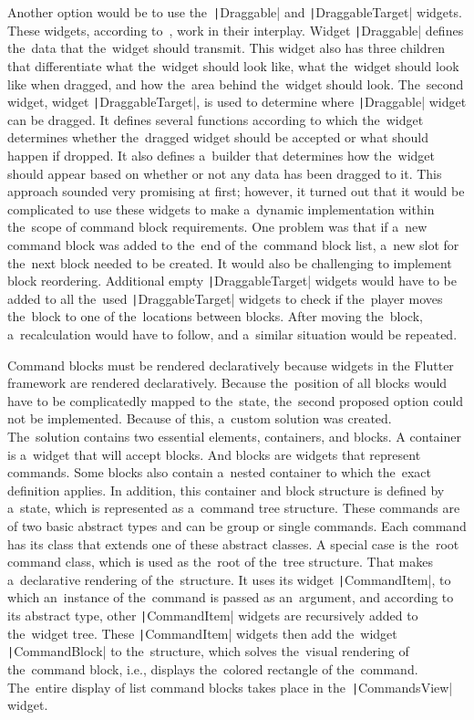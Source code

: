 Another option would be to use the~\texttt|Draggable| and \texttt|DraggableTarget| widgets.
These widgets, according to~\cite{a2022_material}, work in their interplay.
Widget \texttt|Draggable| defines the~data that the~widget should transmit.
This widget also has three children that differentiate what the~widget should look like, what the~widget should look like when dragged, and how the~area behind the~widget should look.
The~second widget, widget \texttt|DraggableTarget|, is used to determine where \texttt|Draggable| widget can be dragged.
It defines several functions according to which the~widget determines whether the~dragged widget should be accepted or what should happen if dropped.
It also defines a~builder that determines how the~widget should appear based on whether or not any data has been dragged to it.
This approach sounded very promising at first; however, it turned out that it would be complicated to use these widgets to make a~dynamic implementation within the~scope of command block requirements.
One problem was that if a~new command block was added to the~end of the~command block list, a~new slot for the~next block needed to be created.
It would also be challenging to implement block reordering.
Additional empty \texttt|DraggableTarget| widgets would have to be added to all the~used \texttt|DraggableTarget| widgets to check if the~player moves the~block to one of the~locations between blocks.
After moving the~block, a~recalculation would have to follow, and a~similar situation would be repeated.

Command blocks must be rendered declaratively because widgets in the \mbox{Flutter} framework are rendered declaratively.
Because the~position of all blocks would have to be complicatedly mapped to the~state, the~second proposed option could not be implemented.
Because of this, a~custom solution was created.
The~solution contains two essential elements, containers, and blocks.
A container is a~widget that will accept blocks.
And blocks are widgets that represent commands.
Some blocks also contain a~nested container to which the~exact definition applies.
In addition, this container and block structure is defined by a~state, which is represented as a~command tree structure.
These commands are of two basic abstract types and can be group or single commands.
Each command has its class that extends one of these abstract classes.
A special case is the~root command class, which is used as the~root of the~tree structure.
That makes a~declarative rendering of the~structure.
\linebreak
It uses its widget \texttt|CommandItem|, to which an~instance of the~command is passed as an~argument, and according to its abstract type, other \texttt|CommandItem| \mbox{widgets} are recursively added to the~widget tree.
These \texttt|CommandItem| widgets then add the~widget \texttt|CommandBlock| to the~structure, which solves the~visual rendering of the~command block, i.e., displays the~colored rectangle of the~command.
The~entire display of list command blocks takes place in the~\texttt|CommandsView| widget.

